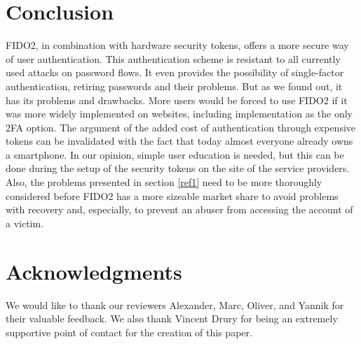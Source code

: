 \documentclass[runningheads]{llncs}
\begin{document}
\section{Conclusion}
FIDO2, in combination with hardware security tokens, offers a more secure way of user authentication. This authentication scheme is resistant to all currently used attacks on password flows. It even provides the possibility of single-factor authentication, retiring passwords and their problems. But as we found out, it has its problems and drawbacks. More users would be forced to use FIDO2 if it was more widely implemented on websites, including implementation as the only 2FA option. The argument of the added cost of authentication through expensive tokens can be invalidated with the fact that today almost everyone already owns a smartphone. In our opinion, simple user education is needed, but this can be done during the setup of the security tokens on the site of the service providers. Also, the problems presented in section \ref{ref1} need to be more thoroughly considered before FIDO2 has a more sizeable market share to avoid problems with recovery and, especially, to prevent an abuser from accessing the account of a victim.

\section*{Acknowledgments}
We would like to thank our reviewers Alexander, Marc, Oliver, and Yannik for their valuable feedback. We also thank Vincent Drury for being an extremely
supportive point of contact for the creation of this paper.



\end{document}
